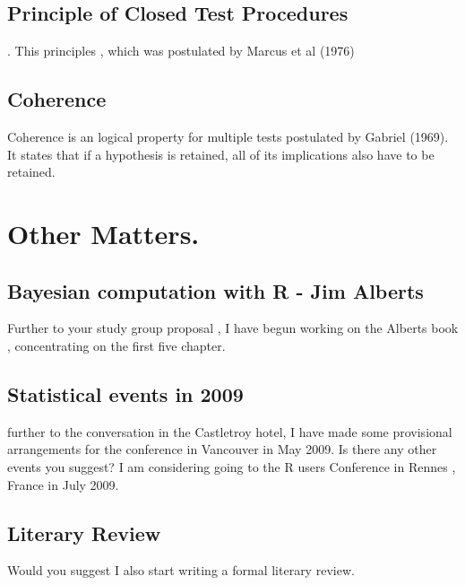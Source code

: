 \documentclass{article}
\begin{document}
\subsection*{Principle of Closed Test Procedures}.
This principles , which was postulated by Marcus et al (1976)

\subsection*{Coherence}
Coherence is an logical property for multiple tests postulated by
Gabriel (1969). It states that if a hypothesis is retained, all of
its implications also have to be retained.

\section*{Other Matters.}
\subsection*{Bayesian computation with R - Jim Alberts}
Further to your study group proposal , I have begun working on the
Alberts book , concentrating on the first five chapter.
\subsection*{Statistical events in 2009}
further to the conversation in the Castletroy hotel, I have made
some provisional arrangements for the conference in Vancouver in
May 2009. Is there any other events you suggest? I am considering
going to the R users Conference in Rennes , France in July 2009.

\subsection*{Literary Review}
Would you suggest I also start writing a formal literary review.
\end{document}
